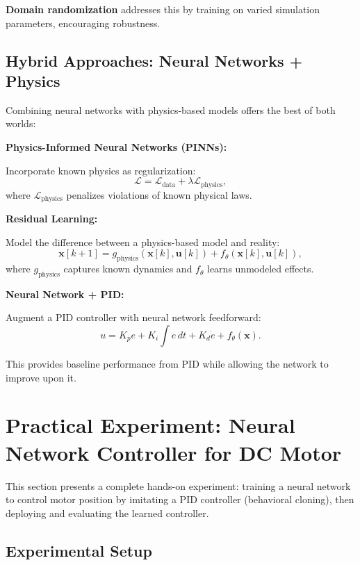 \textbf{Domain randomization} addresses this by training on varied simulation parameters, encouraging robustness.

\subsection{Hybrid Approaches: Neural Networks + Physics}

Combining neural networks with physics-based models offers the best of both worlds:

\textbf{Physics-Informed Neural Networks (PINNs):}

Incorporate known physics as regularization:
\begin{equation}
\mathcal{L} = \mathcal{L}_{\text{data}} + \lambda \mathcal{L}_{\text{physics}},
\end{equation}
where $\mathcal{L}_{\text{physics}}$ penalizes violations of known physical laws.

\textbf{Residual Learning:}

Model the difference between a physics-based model and reality:
\begin{equation}
\mathbf{x}[k+1] = g_{\text{physics}}(\mathbf{x}[k], \mathbf{u}[k]) + f_\theta(\mathbf{x}[k], \mathbf{u}[k]),
\end{equation}
where $g_{\text{physics}}$ captures known dynamics and $f_\theta$ learns unmodeled effects.

\textbf{Neural Network + PID:}

Augment a PID controller with neural network feedforward:
\begin{equation}
u = K_p e + K_i \int e \, dt + K_d \dot{e} + f_\theta(\mathbf{x}).
\end{equation}

This provides baseline performance from PID while allowing the network to improve upon it.


\section{Practical Experiment: Neural Network Controller for DC Motor}

This section presents a complete hands-on experiment: training a neural network to control motor position by imitating a PID controller (behavioral cloning), then deploying and evaluating the learned controller.

\subsection{Experimental Setup}

